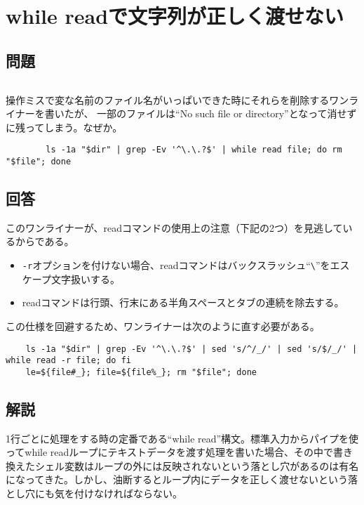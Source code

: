 \section{while readで文字列が正しく渡せない}
\label{recipe:while_read}

\subsection*{問題}
\noindent
$\!\!\!\!\!$
\begin{grshfboxit}{160.0mm}
	操作ミスで変な名前のファイル名がいっぱいできた時にそれらを削除するワンライナーを書いたが、
	一部のファイルは``No such file or directory''となって消せずに残ってしまう。なぜか。
	\begin{verbatim}
		ls -1a "$dir" | grep -Ev '^\.\.?$' | while read file; do rm "$file"; done
	\end{verbatim}
\end{grshfboxit}

\subsection*{回答}
このワンライナーが、readコマンドの使用上の注意（下記の2つ）を見逃しているからである。
\begin{itemize}
  \item \verb|-r|オプションを付けない場合、readコマンドはバックスラッシュ``\verb|\|''をエスケープ文字扱いする。
  \item readコマンドは行頭、行末にある半角スペースとタブの連続を除去する。
\end{itemize}
この仕様を回避するため、ワンライナーは次のように直す必要がある。\\
\begin{verbatim}
	ls -1a "$dir" | grep -Ev '^\.\.?$' | sed 's/^/_/' | sed 's/$/_/' | while read -r file; do fi
	le=${file#_}; file=${file%_}; rm "$file"; done
\end{verbatim}

\subsection*{解説}

1行ごとに処理をする時の定番である``while read''構文。標準入力からパイプを使ってwhile readループにテキストデータを渡す処理を書いた場合、その中で書き換えたシェル変数はループの外には反映されないという落とし穴があるのは有名になってきた。しかし、油断するとループ内にデータを正しく渡せないという落とし穴にも気を付けなければならない。

